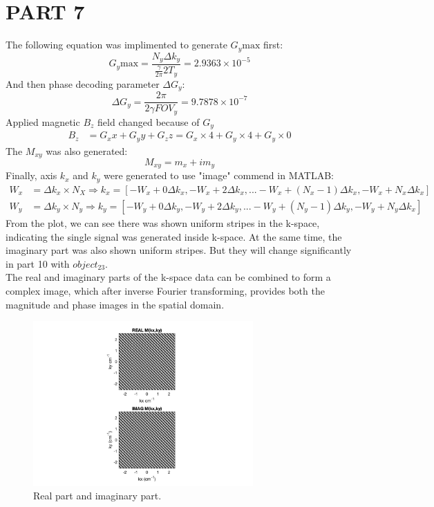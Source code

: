 \documentclass{report}
\begin{document}
\section[short]{PART 7}
The following equation was implimented to generate $G_y{\text{max}}$ first:
\[
G_y{\text{max}} = \frac{N_y \Delta k_y}{\frac{\gamma}{2\pi} 2 T_y} = 2.9363 \times 10^{-5}
\]
And then phase decoding parameter $\Delta G_y$:
\[
\Delta G_y = \frac{2 \pi}{2 \gamma FOV_y} = 9.7878 \times 10^{-7}
\]
Applied magnetic $B_z$ field changed because of $G_y$ 
\begin{align*}
 B_z &= G_{x} x + G_{y} y + G_{z} z = G_x \times 4 + G_y \times 4 + G_y \times 0
\end{align*}
The $M_{xy}$ was also generated:
\[
 M_{xy} = m_x + i m_y
\]
Finally, axis $k_x$ and $k_y$ were generated to use "image" commend in MATLAB:
\begin{align*}
W_x &= \Delta k_x \times N_X \Rightarrow k_x = [-W_x + 0 \Delta k_x, -W_x + 2 \Delta k_x, ... -W_x + (N_x - 1) \Delta k_x, -W_x + N_x \Delta k_x]\\
W_y &= \Delta k_y \times N_y \Rightarrow k_y = [-W_y + 0 \Delta k_y, -W_y + 2 \Delta k_y, ... -W_y + (N_y - 1) \Delta k_y, -W_y + N_y \Delta k_x]
\end{align*}
From the plot, we can see there was shown uniform stripes in the k-space, indicating 
the single signal was generated inside k-space.
At the same time, the imaginary part was also shown uniform stripes. But they will change significantly in part 10 with $object_{23}$.\\
The real and imaginary parts of the k-space data can be combined to form a complex image, 
which after inverse Fourier transforming, provides both the magnitude and phase images in the spatial domain.
\begin{figure}[hb]
    \centering
    \includegraphics[width=0.75\textwidth]{7.png}
    \caption{Real part and imaginary part.}
\end{figure}
\newpage 
\end{document}
